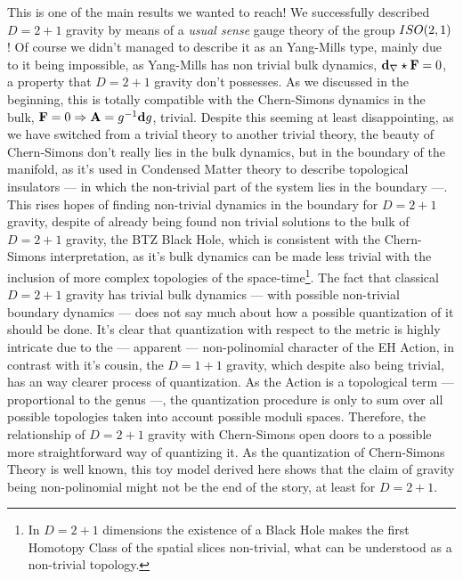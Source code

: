 This is one of the main results we wanted to reach! We successfully described $D=2+1$ gravity by means of a \textit{usual sense} gauge theory of the group $ISO\qty(2,1)$! Of course we didn't managed to describe it as an Yang-Mills type, mainly due to it being impossible, as Yang-Mills has 
non trivial bulk dynamics, $\vb d_\nabla\star\vb F=0$, a property that $D=2+1$ gravity don't possesses. As we discussed in the beginning, this is totally compatible with the Chern-Simons dynamics in the bulk, $\vb F=0\Rightarrow\vb A=g^{-1}\vb d g$, trivial. Despite this seeming at least disappointing, 
as we have switched from a trivial theory to another trivial theory, the beauty of Chern-Simons don't really lies in the bulk dynamics, but in the boundary of the manifold, as it's used in 
Condensed Matter theory to describe topological insulators --- in which the non-trivial part of the system lies in the boundary ---. This rises hopes of finding non-trivial dynamics in the boundary for $D=2+1$ gravity, despite of 
already being found non trivial solutions to the bulk of $D=2+1$ gravity, the BTZ Black Hole, which is consistent with the Chern-Simons interpretation, as it's bulk dynamics can be made less trivial with the inclusion of more complex topologies 
of the space-time\footnote{In $D=2+1$ dimensions the existence of a Black Hole makes the first Homotopy Class of the spatial slices non-trivial, what can be understood as a non-trivial topology.}. The fact that classical $D=2+1$ gravity has trivial bulk dynamics --- with possible non-trivial boundary dynamics --- does not say much about how a possible quantization of it should be done. 
It's clear that quantization with respect to the metric is highly intricate due to the --- apparent --- non-polinomial character of the EH Action, in contrast with it's cousin, the $D=1+1$ gravity, which despite also being trivial, has an 
way clearer process of quantization. As the Action is a topological term --- proportional to the genus ---, the quantization procedure is only to sum over all possible topologies taken into account possible moduli spaces. Therefore, the relationship of 
$D=2+1$ gravity with Chern-Simons open doors to a possible more straightforward way of quantizing it. As the quantization of Chern-Simons Theory is well known, this toy model derived here shows that the claim 
of gravity being non-polinomial might not be the end of the story, at least for $D=2+1$.

